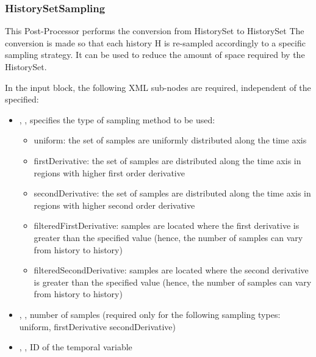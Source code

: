 \subsubsection{HistorySetSampling}
\label{HistorySetSampling}

This Post-Processor performs the conversion from HistorySet to HistorySet
The conversion is made so that each history H is re-sampled accordingly  to a
specific sampling strategy.
It can be used to reduce the amount of space required by the HistorySet.


In the  input block, the following XML sub-nodes are required,
independent of the  specified:

\begin{itemize}
   \item {}, , specifies the type of sampling method to be used:
   \begin{itemize}
     \item uniform: the set of  samples are uniformly distributed along the time axis
     \item firstDerivative: the set of  samples are distributed along the time axis in regions with
                            higher first order derivative
     \item secondDerivative: the set of  samples are distributed along the time axis in regions with
                             higher second order derivative
     \item filteredFirstDerivative: samples are located where the first derivative is greater than the specified  value
                                    (hence, the number of samples can vary from history to history)
     \item filteredSecondDerivative: samples are located where the second derivative is greater than the specified  value
                                     (hence, the number of samples can vary from history to history)
   \end{itemize}
   \item {}, , number of samples (required only for the following sampling
                                             types: uniform, firstDerivative secondDerivative)
   \item {}, , ID of the temporal variable

\end{itemize}
